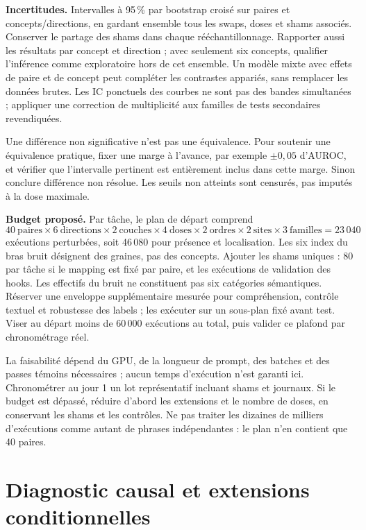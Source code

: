\documentclass[10pt,a4paper]{article}
\begin{document}
\textbf{Incertitudes.} Intervalles à 95\,\% par bootstrap croisé sur paires et concepts/directions, en gardant ensemble tous les swaps, doses et shams associés. Conserver le partage des shams dans chaque rééchantillonnage. Rapporter aussi les résultats par concept et direction ; avec seulement six concepts, qualifier l'inférence comme exploratoire hors de cet ensemble. Un modèle mixte avec effets de paire et de concept peut compléter les contrastes appariés, sans remplacer les données brutes. Les IC ponctuels des courbes ne sont pas des bandes simultanées ; appliquer une correction de multiplicité aux familles de tests secondaires revendiquées.

Une différence non significative n'est pas une équivalence. Pour soutenir une équivalence pratique, fixer une marge à l'avance, par exemple $\pm0{,}05$ d'AUROC, et vérifier que l'intervalle pertinent est entièrement inclus dans cette marge. Sinon conclure \og différence non résolue\fg{}. Les seuils non atteints sont censurés, pas imputés à la dose maximale.

\textbf{Budget proposé.} Par tâche, le plan de départ comprend
\[
40\ \text{paires}\times6\ \text{directions}\times2\ \text{couches}\times4\ \text{doses}
\times2\ \text{ordres}\times2\ \text{sites}\times3\ \text{familles}
=23\,040
\]
exécutions perturbées, soit 46\,080 pour présence et localisation. Les six index du bras bruit désignent des graines, pas des concepts. Ajouter les shams uniques : 80 par tâche si le mapping est fixé par paire, et les exécutions de validation des hooks. Les effectifs du bruit ne constituent pas six catégories sémantiques. Réserver une enveloppe supplémentaire mesurée pour compréhension, contrôle textuel et robustesse des labels ; les exécuter sur un sous-plan fixé avant test. Viser au départ moins de 60\,000 exécutions au total, puis valider ce plafond par chronométrage réel.

La faisabilité dépend du GPU, de la longueur de prompt, des batches et des passes témoins nécessaires ; aucun temps d'exécution n'est garanti ici. Chronométrer au jour 1 un lot représentatif incluant shams et journaux. Si le budget est dépassé, réduire d'abord les extensions et le nombre de doses, en conservant les shams et les contrôles. Ne pas traiter les dizaines de milliers d'exécutions comme autant de phrases indépendantes : le plan n'en contient que 40 paires.

\section{Diagnostic causal et extensions conditionnelles}
\end{document}
